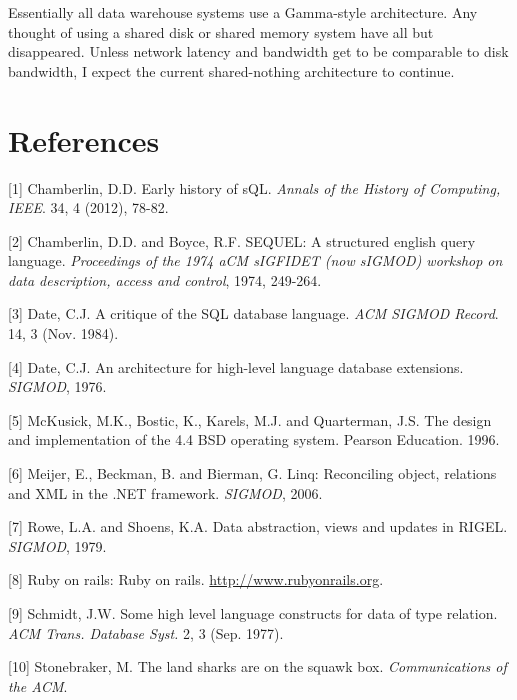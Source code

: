 \documentclass[b5paper,11pt,twoside,openright]{book}
\begin{document}
Essentially all data warehouse systems use a Gamma-style architecture.
Any thought of using a shared disk or shared memory system have all but
disappeared. Unless network latency and bandwidth get to be comparable
to disk bandwidth, I expect the current shared-nothing architecture to
continue.

\section*{References}

\leavevmode\hypertarget{ref-chamberlin-history}{}%
{[}1{]} Chamberlin, D.D. Early history of sQL. \emph{Annals of the
  History of Computing, IEEE}. 34, 4 (2012), 78-82.

\leavevmode\hypertarget{ref-chamberlin-sequel}{}%
{[}2{]} Chamberlin, D.D. and Boyce, R.F. SEQUEL: A structured english
query language. \emph{Proceedings of the 1974 aCM sIGFIDET (now sIGMOD)
  workshop on data description, access and control}, 1974, 249-264.

\leavevmode\hypertarget{ref-date}{}%
{[}3{]} Date, C.J. A critique of the SQL database language. \emph{ACM
  SIGMOD Record}. 14, 3 (Nov. 1984).

\leavevmode\hypertarget{ref-date-language}{}%
{[}4{]} Date, C.J. An architecture for high-level language database
extensions. \emph{SIGMOD}, 1976.

\leavevmode\hypertarget{ref-bsdunix}{}%
{[}5{]} McKusick, M.K., Bostic, K., Karels, M.J. and Quarterman, J.S.
The design and implementation of the 4.4 BSD operating system. Pearson
Education. 1996.

\leavevmode\hypertarget{ref-linq}{}%
{[}6{]} Meijer, E., Beckman, B. and Bierman, G. Linq: Reconciling
object, relations and XML in the .NET framework. \emph{SIGMOD}, 2006.

\leavevmode\hypertarget{ref-rigel}{}%
{[}7{]} Rowe, L.A. and Shoens, K.A. Data abstraction, views and updates
in RIGEL. \emph{SIGMOD}, 1979.

\leavevmode\hypertarget{ref-rails}{}%
{[}8{]} Ruby on rails: Ruby on rails. \url{http://www.rubyonrails.org}.

\leavevmode\hypertarget{ref-pascalr}{}%
{[}9{]} Schmidt, J.W. Some high level language constructs for data of
type relation. \emph{ACM Trans. Database Syst.} 2, 3 (Sep. 1977).

\leavevmode\hypertarget{ref-stonebraker-turing}{}%
{[}10{]} Stonebraker, M. The land sharks are on the squawk box.
\emph{Communications of the ACM}.
\end{document}
